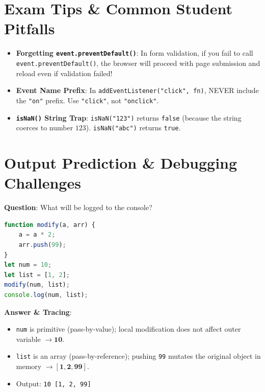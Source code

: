 \section{Exam Tips \& Common Student Pitfalls}

\begin{examtip}
\begin{itemize}[leftmargin=1.5em]
    \item \textbf{Forgetting \texttt{event.preventDefault()}}: In form validation, if you fail to call \texttt{event.preventDefault()}, the browser will proceed with page submission and reload even if validation failed!
    \item \textbf{Event Name Prefix}: In \texttt{addEventListener("click", fn)}, NEVER include the \texttt{"on"} prefix. Use \texttt{"click"}, not \texttt{"onclick"}.
    \item \textbf{\texttt{isNaN()} String Trap}: \texttt{isNaN("123")} returns \texttt{false} (because the string coerces to number $123$). \texttt{isNaN("abc")} returns \texttt{true}.
\end{itemize}
\end{examtip}

\section{Output Prediction \& Debugging Challenges}

\begin{outputprediction}
\textbf{Question}: What will be logged to the console?
\begin{lstlisting}[language=JavaScript]
function modify(a, arr) {
    a = a * 2;
    arr.push(99);
}
let num = 10;
let list = [1, 2];
modify(num, list);
console.log(num, list);
\end{lstlisting}
\textbf{Answer \& Tracing}:
\begin{itemize}
    \item \texttt{num} is primitive (pass-by-value); local modification does not affect outer variable $\to \mathbf{10}$.
    \item \texttt{list} is an array (pass-by-reference); pushing \texttt{99} mutates the original object in memory $\to \mathbf{[1, 2, 99]}$.
    \item Output: \texttt{10 [1, 2, 99]}
\end{itemize}
\end{outputprediction}


